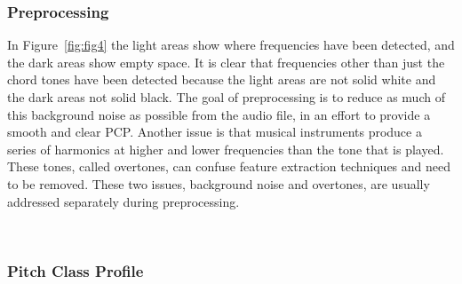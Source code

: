 \documentclass{sig-alternate}
\begin{document}
\subsubsection{Preprocessing}

In Figure~\ref{fig:fig4} the light areas show where frequencies have been detected, and the dark areas show empty space. It is clear that frequencies other than just the chord tones have been detected because the light areas are not solid white and the dark areas not solid black. The goal of preprocessing is to reduce as much of this background noise as possible from the audio file, in an effort to provide a smooth and clear PCP. Another issue is that musical instruments produce a series of harmonics at higher and lower frequencies than the tone that is played. These tones, called overtones, can confuse feature extraction techniques and need to be removed. These two issues, background noise and overtones, are usually addressed separately during preprocessing.



~\\

\subsubsection{Pitch Class Profile} 
\end{document}
